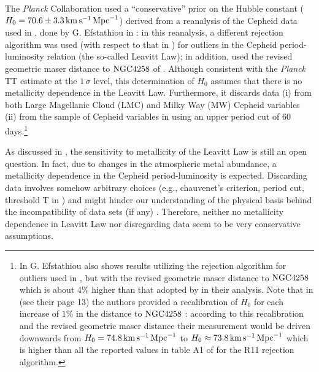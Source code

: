 The \textit{Planck} Collaboration used a ``conservative'' prior on the Hubble constant ($H_0=70.6\pm3.3\, \mathrm{km}\, \mathrm{s}^{-1}\, \mathrm{Mpc}^{-1}$) derived from a reanalysis of the Cepheid data used in \cite{Riess:2011yx}, done by G. Efstathiou in \cite{Efstathiou:2013via}: in this reanalysis, a different rejection algorithm was used (with respect to that in \cite{Riess:2011yx}) for outliers in the Cepheid period-luminosity relation (the so-called Leavitt Law); in addition, \cite{Efstathiou:2013via} used the revised geometric maser distance to $\mathrm{NGC4258}$ of \cite{Humphreys:2013eja}. Although consistent with the \textit{Planck} TT estimate at the $1\, \sigma$ level, this determination of $H_0$ assumes that there is no metallicity dependence in the Leavitt Law. Furthermore, it discards data (i) from both Large Magellanic Cloud (LMC) and Milky Way (MW) Cepheid variables (ii) from the sample of Cepheid variables in \cite{Riess:2011yx} using an upper period cut of $60$ days.\footnote{In \cite{Efstathiou:2013via} G. Efstathiou also shows results utilizing the rejection algorithm for outliers used in \cite{Riess:2011yx}, but with the revised geometric maser distance to $\mathrm{NGC4258}$ \cite{Humphreys:2013eja} which is about $4\%$ higher than that adopted by \cite{Riess:2011yx} in their analysis. Note that in \cite{Riess:2011yx} (see their page 13) the authors provided a recalibration of $H_0$ for each increase of $1\%$ in the distance to $\mathrm{NGC4258}$ : according to this recalibration and the revised geometric maser distance their measurement would be driven downwards from $H_0 = 74.8\, \mathrm{km} \, \mathrm{s}^{-1}\, \mathrm{Mpc}^{-1}$ to $H_0 \approx 73.8 \, \mathrm{km} \, \mathrm{s}^{-1}\, \mathrm{Mpc}^{-1}$ which is higher than all the reported values in table A1 of \cite{Efstathiou:2013via} for the R11 rejection algorithm.}

As discussed in \cite{Freedman:2010xv}, the sensitivity to metallicity of the Leavitt Law is still an open question. In fact, due to changes in the atmospheric metal abundance, a metallicity dependence in the Cepheid period-luminosity is expected. Discarding data involves somehow arbitrary choices (e.g., chauvenet's criterion, period cut, threshold T in \cite{Efstathiou:2013via}) and might hinder our understanding of the physical basis behind the incompatibility of data sets (if any) \cite{Press:1996fw}. Therefore, neither no metallicity dependence in Leavitt Law nor disregarding data seem to be very conservative assumptions. 

